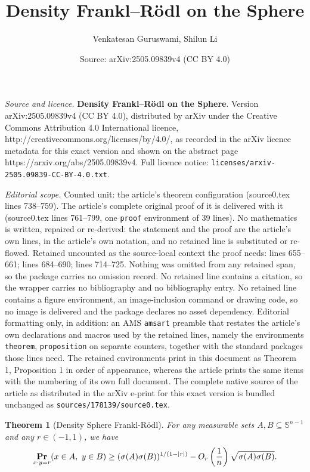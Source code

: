 \documentclass[10pt,a4paper]{amsart}
\title{\textbf{Density Frankl–Rödl on the Sphere}}
\author{Venkatesan Guruswami, Shilun Li}
\date{Source: arXiv:2505.09839v4 (CC BY 4.0)}
\newtheorem{theorem}{Theorem}
\renewcommand{\Pr}{\mathop{\bf Pr\/}}
\newcommand{\sn}{{\mathbb{S}^{n-1} }}
\begin{document}
\maketitle

\noindent\emph{Source and licence.} \textbf{Density Frankl–Rödl on the Sphere}. Version arXiv:2505.09839v4 (CC BY 4.0), distributed by arXiv under the Creative Commons Attribution 4.0 International licence, http://creativecommons.org/licenses/by/4.0/, as recorded in the arXiv licence metadata for this exact version and shown on the abstract page https://arxiv.org/abs/2505.09839v4. Full licence notice: \texttt{licenses/arxiv-2505.09839-CC-BY-4.0.txt}.\par\smallskip

\noindent\textit{Editorial scope.} Counted unit: the article's theorem configuration (source0.tex lines 738--759). The article's complete original proof of it is delivered with it (source0.tex lines 761--799, one \texttt{proof} environment of 39 lines). No mathematics is written, repaired or re-derived: the statement and the proof are the article's own lines, in the article's own notation, and no retained line is substituted or re-flowed.  Retained uncounted as the source-local context the proof needs: lines 655--661; lines 684--690; lines 714--725.  Nothing was omitted from any retained span, so the package carries no omission record.  No retained line contains a citation, so the wrapper carries no bibliography and no bibliography entry.  No retained line contains a figure environment, an image-inclusion command or drawing code, so no image is delivered and the package declares no asset dependency.  Editorial formatting only, in addition: an AMS \texttt{amsart} preamble that restates the article's own declarations and macros used by the retained lines, namely the environments \texttt{theorem}, \texttt{proposition} on separate counters, together with the standard packages those lines need.  The retained environments print in this document as Theorem 1, Proposition 1 in order of appearance, whereas the article prints the same items with the numbering of its own full document.  The complete native source of the article as distributed in the arXiv e-print for this exact version is bundled unchanged as \texttt{sources/178139/source0.tex}.
\begin{theorem}[Density Sphere Frankl-R\"{o}dl]
\label{thm: two set probability}
For any measurable sets \( A, B \subseteq \sn \) and any \( r \in (-1,1) \), we have
\[
\Pr_{x\cdot y = r}(x \in A,\ y \in B) \geq (\sigma(A)\sigma(B))^{1/(1 - |r|)} - O_r\left(\frac{1}{n}\right)\sqrt{\sigma(A)\sigma(B)}.
\]
\end{theorem}
\end{document}
